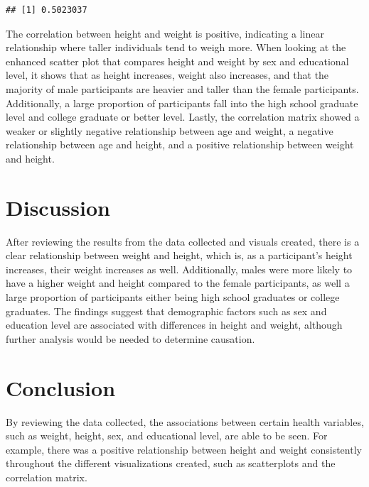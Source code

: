 \documentclass[
]{article}
\newenvironment{Shaded}{\begin{snugshade}}{\end{snugshade}}
\newcommand{\FunctionTok}[1]{\textcolor[rgb]{0.13,0.29,0.53}{\textbf{#1}}}
\newcommand{\NormalTok}[1]{#1}
\newcommand{\SpecialCharTok}[1]{\textcolor[rgb]{0.81,0.36,0.00}{\textbf{#1}}}
\begin{document}
\begin{Shaded}
\end{Shaded}

\begin{verbatim}
## [1] 0.5023037
\end{verbatim}

The correlation between height and weight is positive, indicating a
linear relationship where taller individuals tend to weigh more. When
looking at the enhanced scatter plot that compares height and weight by
sex and educational level, it shows that as height increases, weight
also increases, and that the majority of male participants are heavier
and taller than the female participants. Additionally, a large
proportion of participants fall into the high school graduate level and
college graduate or better level. Lastly, the correlation matrix showed
a weaker or slightly negative relationship between age and weight, a
negative relationship between age and height, and a positive
relationship between weight and height.

\section{Discussion}\label{discussion}

After reviewing the results from the data collected and visuals created,
there is a clear relationship between weight and height, which is, as a
participant's height increases, their weight increases as well.
Additionally, males were more likely to have a higher weight and height
compared to the female participants, as well a large proportion of
participants either being high school graduates or college graduates.
The findings suggest that demographic factors such as sex and education
level are associated with differences in height and weight, although
further analysis would be needed to determine causation.

\section{Conclusion}\label{conclusion}

By reviewing the data collected, the associations between certain health
variables, such as weight, height, sex, and educational level, are able
to be seen. For example, there was a positive relationship between
height and weight consistently throughout the different visualizations
created, such as scatterplots and the correlation matrix.
\end{document}
